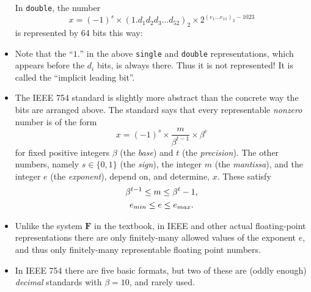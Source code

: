 \documentclass[11pt]{amsart}
\begin{document}
\begin{itemize}
\noindent In \texttt{double}, the number
       $$x = (-1)^s \times \left(1.d_1 d_2 d_3 \dots d_{52}\right)_{2} \times 2^{\left(e_1\dots e_{11}\right)_2 - 1023}$$
is represented by 64 bits this way:

\medskip

\item Note that the ``$1.$'' in the above \texttt{single} and  \texttt{double} representations, which appears before the $d_i$ bits, is always there.  Thus it is not represented!  It is called the ``implicit leading bit''.

\item The IEEE 754 standard is slightly more abstract than the concrete way the bits are arranged above.  The standard says that every representable \emph{nonzero} number is of the form
\begin{equation}
x = (-1)^s \times \frac{m}{\beta^{t-1}} \times \beta^e  \label{ieeeform}
\end{equation}
for fixed positive integers $\beta$ (the \emph{base}) and $t$ (the \emph{precision}).  The other numbers, namely $s\in\{0,1\}$ (the \emph{sign}), the integer $m$ (the \emph{mantissa}), and the integer $e$ (the \emph{exponent}), depend on, and determine, $x$.  These satisfy
\begin{gather}
\beta^{t-1} \le m \le \beta^t - 1, \label{ieeeconstraint} \\
e_{min} \le e \le e_{max}. \notag
\end{gather}

\item Unlike the system $\mathbf{F}$ in the textbook, in IEEE and other actual floating-point representations there are only finitely-many allowed values of the exponent $e$, and thus only finitely-many representable floating point numbers.

\item In IEEE 754 there are five basic formats, but two of these are (oddly enough) \emph{decimal} standards with $\beta=10$, and rarely used.


\end{itemize}
\end{document}

